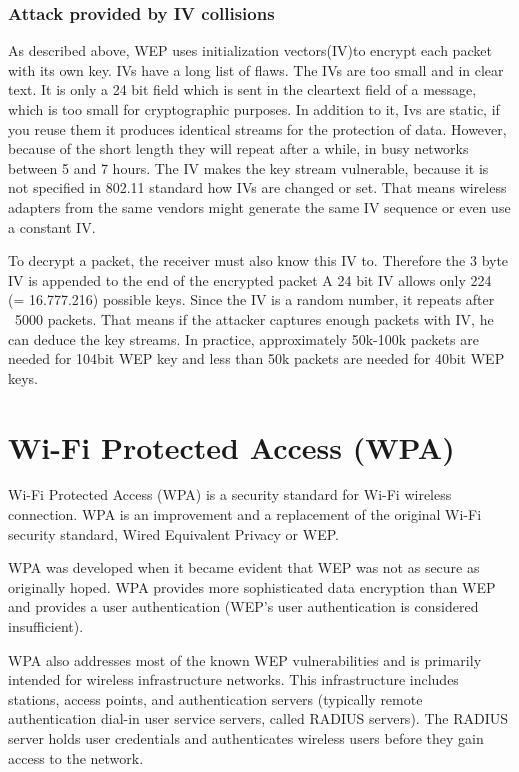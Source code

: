 \documentclass[a4paper,12pt,pagesize,headsepline,bibtotoc,titlepage]{scrartcl}
\begin{document}
\subsubsection{Attack provided by IV collisions}

As described above,  WEP uses initialization vectors(IV)to encrypt each packet
with its own key.
IVs have a long list of flaws.
The IVs are too small and in clear text. 
It is only a 24 bit field which is sent in the cleartext field of a message, which is too small for cryptographic purposes. 
In addition to it, Ivs are static, if you reuse them it produces identical streams for  the protection of data. However, because of the short length they will repeat after a while, in busy networks between 5 and 7 hours.
The IV makes the key stream vulnerable, because it is not specified in 802.11 standard how IVs are changed or set. That means wireless adapters from the same vendors might generate the same IV sequence or even use a constant IV.

To decrypt a packet, the receiver must also know this IV to.
Therefore the 3 byte IV is appended to the end of the encrypted packet
A 24 bit IV allows only 224 (= 16.777.216) possible keys. Since the IV is a random number, it repeats after ~5000 packets.
That means if the attacker captures enough packets with IV, he can deduce the key streams.
In practice, approximately 50k-100k packets are needed for 104bit WEP key and less than 50k packets are needed  for 40bit WEP keys.

\newpage
\section{Wi-Fi Protected Access (WPA)}


Wi-Fi Protected Access (WPA) is a security standard for Wi-Fi wireless connection. WPA is an improvement and a replacement of the original Wi-Fi security standard, Wired Equivalent Privacy or WEP. 

WPA was developed when it became evident that WEP was not as secure as originally hoped. WPA provides more sophisticated data encryption than WEP and provides a user authentication (WEP's user authentication is considered insufficient).

WPA also addresses most of the known WEP vulnerabilities and is primarily intended for wireless infrastructure networks. This infrastructure includes stations, access points, and authentication servers (typically remote authentication dial-in user service servers, called RADIUS servers). The RADIUS server holds user credentials and authenticates wireless users before they gain access to the network.
\end{document}
